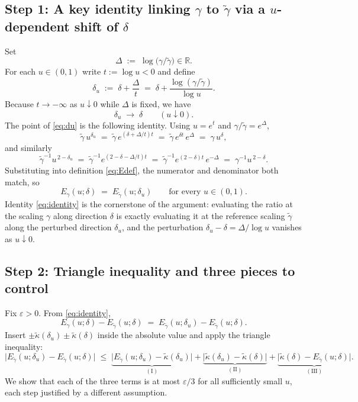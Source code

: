 \documentclass[11pt]{article}
\theoremstyle{definition}
\newcommand{\R}{\mathbb{R}}
\newcommand{\eps}{\varepsilon}
\begin{document}
\subsection*{Step 1: A key identity linking $\gamma$ to $\tilde\gamma$
via a $u$-dependent shift of $\delta$}

Set
\[
\Delta \;:=\; \log\!\bigl(\gamma/\tilde\gamma\bigr) \in \R.
\]
For each $u\in(0,1)$ write $t:=\log u<0$ and define
\begin{equation}\label{eq:du}
\delta_u \;:=\; \delta + \frac{\Delta}{t}
\;=\; \delta + \frac{\log(\gamma/\tilde\gamma)}{\log u}.
\end{equation}
Because $t\to-\infty$ as $u\downarrow 0$ while $\Delta$ is fixed, we
have
\begin{equation}\label{eq:du-conv}
\delta_u\;\longrightarrow\;\delta \qquad (u\downarrow 0).
\end{equation}
The point of \eqref{eq:du} is the following identity. Using $u=e^t$
and $\gamma/\tilde\gamma=e^\Delta$,
\[
\tilde\gamma\,u^{\delta_u}
\;=\;\tilde\gamma\,e^{(\delta+\Delta/t)t}
\;=\;\tilde\gamma\,e^{\delta t}\,e^{\Delta}
\;=\;\gamma\,u^{\delta},
\]
and similarly
\[
\tilde\gamma^{-1}u^{\,2-\delta_u}
\;=\;\tilde\gamma^{-1}e^{(2-\delta-\Delta/t)t}
\;=\;\tilde\gamma^{-1}e^{(2-\delta)t}\,e^{-\Delta}
\;=\;\gamma^{-1}u^{\,2-\delta}.
\]
Substituting into definition \eqref{eq:Edef}, the numerator and
denominator both match, so
\begin{equation}\label{eq:identity}
E_{\gamma}(u;\delta) \;=\; E_{\tilde\gamma}(u;\delta_u)
\qquad \text{for every }u\in(0,1).
\end{equation}
Identity \eqref{eq:identity} is the cornerstone of the argument:
evaluating the ratio at the scaling $\gamma$ along direction $\delta$
is exactly evaluating it at the reference scaling $\tilde\gamma$ along
the perturbed direction $\delta_u$, and the perturbation
$\delta_u-\delta=\Delta/\log u$ vanishes as $u\downarrow 0$.

\subsection*{Step 2: Triangle inequality and three pieces to control}

Fix $\eps>0$. From \eqref{eq:identity},
\[
E_\gamma(u;\delta) - E_{\tilde\gamma}(u;\delta)
\;=\;
E_{\tilde\gamma}(u;\delta_u) - E_{\tilde\gamma}(u;\delta).
\]
Insert $\pm\tilde\kappa(\delta_u)\pm\tilde\kappa(\delta)$ inside the
absolute value and apply the triangle inequality:
\begin{equation}\label{eq:triangle}
\bigl|E_{\tilde\gamma}(u;\delta_u)-E_{\tilde\gamma}(u;\delta)\bigr|
\;\le\;
\underbrace{\bigl|E_{\tilde\gamma}(u;\delta_u)-\tilde\kappa(\delta_u)\bigr|}_{(\mathrm{I})}
+
\underbrace{\bigl|\tilde\kappa(\delta_u)-\tilde\kappa(\delta)\bigr|}_{(\mathrm{II})}
+
\underbrace{\bigl|\tilde\kappa(\delta)-E_{\tilde\gamma}(u;\delta)\bigr|}_{(\mathrm{III})}.
\end{equation}
We show that each of the three terms is at most $\eps/3$ for all
sufficiently small $u$, each step justified by a different
assumption.
\end{document}

